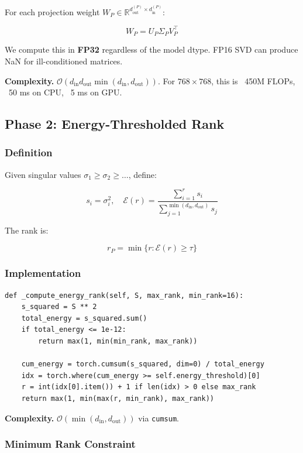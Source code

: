 For each projection weight $W_P \in \mathbb{R}^{d_\text{out}^{(P)} \times d_\text{in}^{(P)}}$:

\[
W_P = U_P \Sigma_P V_P^\top
\tag{4.1}
\]

We compute this in \textbf{FP32} regardless of the model dtype. FP16 SVD can 
produce NaN for ill-conditioned matrices.

\textbf{Complexity.} $\mathcal{O}(d_\text{in} d_\text{out} \min(d_\text{in}, d_\text{out}))$. 
For $768 \times 768$, this is ~450M FLOPs, ~50 ms on CPU, ~5 ms on GPU.

\subsection{Phase 2: Energy-Thresholded Rank}

\subsubsection{Definition}

Given singular values $\sigma_1 \geq \sigma_2 \geq \dots$, define:

\[
s_i = \sigma_i^2, \quad \mathcal{E}(r) = \frac{\sum_{i=1}^{r} s_i}{\sum_{j=1}^{\min(d_\text{in}, d_\text{out})} s_j}
\tag{4.2}
\]

The rank is:

\[
r_P = \min\{r : \mathcal{E}(r) \geq \tau\}
\tag{4.3}
\]

\subsubsection{Implementation}

\begin{lstlisting}
def _compute_energy_rank(self, S, max_rank, min_rank=16):
    s_squared = S ** 2
    total_energy = s_squared.sum()
    if total_energy <= 1e-12:
        return max(1, min(min_rank, max_rank))
    
    cum_energy = torch.cumsum(s_squared, dim=0) / total_energy
    idx = torch.where(cum_energy >= self.energy_threshold)[0]
    r = int(idx[0].item()) + 1 if len(idx) > 0 else max_rank
    return max(1, min(max(r, min_rank), max_rank))
\end{lstlisting}

\textbf{Complexity.} $\mathcal{O}(\min(d_\text{in}, d_\text{out}))$ via \texttt{cumsum}.

\subsubsection{Minimum Rank Constraint}

